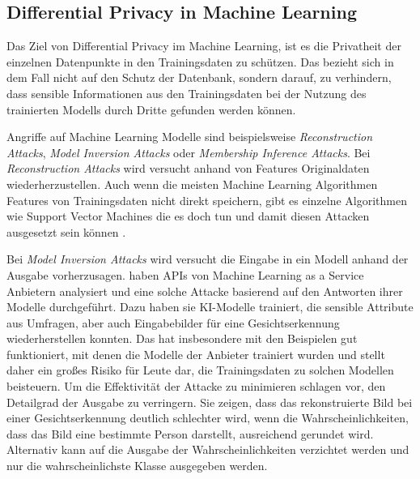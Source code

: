 \subsection{Differential Privacy in Machine Learning}\label{sec:fund-dp-in-ml}


Das Ziel von Differential Privacy im Machine Learning, ist es die Privatheit der einzelnen Datenpunkte in den Trainingsdaten zu schützen. Das bezieht sich in dem Fall nicht auf den Schutz der Datenbank, sondern darauf, zu verhindern, dass sensible Informationen aus den Trainingsdaten bei der Nutzung des trainierten Modells durch Dritte gefunden werden können. 

Angriffe auf Machine Learning Modelle sind beispielsweise \textit{Reconstruction Attacks}, \textit{Model Inversion Attacks} oder \textit{Membership Inference Attacks}. Bei \textit{Reconstruction Attacks} wird versucht anhand von Features Originaldaten wiederherzustellen. Auch wenn die meisten Machine Learning Algorithmen Features von Trainingsdaten nicht direkt speichern, gibt es einzelne Algorithmen wie Support Vector Machines die es doch tun und damit diesen Attacken ausgesetzt sein können \cite[p.9ff]{chang:2023}.

Bei \textit{Model Inversion Attacks} wird versucht die Eingabe in ein Modell anhand der Ausgabe vorherzusagen. \textcite{fredrikson:2015} haben APIs von Machine Learning as a Service Anbietern analysiert und eine solche Attacke basierend auf den Antworten ihrer Modelle durchgeführt. Dazu haben sie KI-Modelle trainiert, die sensible Attribute aus Umfragen, aber auch Eingabebilder für eine Gesichtserkennung wiederherstellen konnten. Das hat insbesondere mit den Beispielen gut funktioniert, mit denen die Modelle der Anbieter trainiert wurden und stellt daher ein großes Risiko für Leute dar, die Trainingsdaten zu solchen Modellen beisteuern. Um die Effektivität der Attacke zu minimieren schlagen \citeauthor{fredrikson:2015} vor, den Detailgrad der Ausgabe zu verringern. Sie zeigen, dass das rekonstruierte Bild bei einer Gesichtserkennung deutlich schlechter wird, wenn die Wahrscheinlichkeiten, dass das Bild eine bestimmte Person darstellt, ausreichend gerundet wird. Alternativ kann auf die Ausgabe der Wahrscheinlichkeiten verzichtet werden und nur die wahrscheinlichste Klasse ausgegeben werden.

